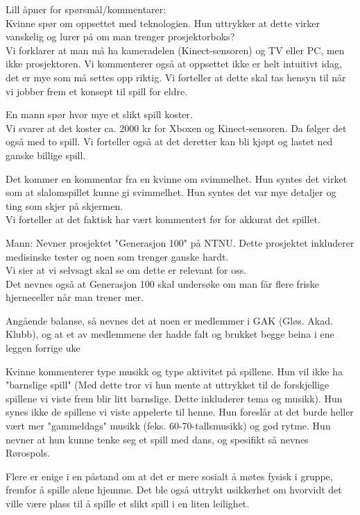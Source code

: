Lill åpner for spørsmål/kommentarer: \\
Kvinne spør om oppsettet med teknologien. Hun uttrykker at dette virker vanskelig og lurer på om man trenger prosjektorboks?\\
Vi forklarer at man må ha kameradelen (Kinect-sensoren) og TV eller PC, men ikke prosjektoren.
Vi kommenterer også at oppsettet ikke er helt intuitivt idag, det er mye som må settes opp riktig. Vi forteller at dette skal tas hensyn til når vi jobber frem et konsept til spill for eldre.

En mann spør hvor mye et slikt spill koster. \\
Vi svarer at det koster ca. 2000 kr for Xboxen og Kinect-sensoren. Da følger det også med to spill. Vi forteller også at det deretter kan bli kjøpt og lastet ned ganske billige spill.

Det kommer en kommentar fra en kvinne om svimmelhet. Hun syntes det virket som at slalomspillet kunne gi svimmelhet. Hun syntes det var mye detaljer og ting som skjer på skjermen. \\
Vi forteller at det faktisk har vært kommentert før for akkurat det spillet.

Mann: Nevner prosjektet "Generasjon 100" på NTNU. Dette prosjektet inkluderer medisinske tester og noen som trenger ganske hardt. \\
Vi sier at vi selvsagt skal se om dette er relevant for oss. \\ 
Det nevnes også at Generasjon 100 skal undersøke om man får flere friske hjerneceller når man trener mer.

Angående balanse, så nevnes det at noen er medlemmer i GAK 
(Gløs. Akad. Klubb), og at et av medlemmene der hadde falt og brukket
begge beina i ene leggen forrige uke

Kvinne kommenterer type musikk og type aktivitet på spillene.
Hun vil ikke ha "barnslige spill" (Med dette tror vi hun mente at uttrykket til de forskjellige spillene vi viste frem blir litt barnslige. Dette inkluderer tema og musikk). Hun synes ikke de spillene vi viste appelerte til henne. Hun foreslår at det burde heller vært mer "gammeldags" musikk (feks. 60-70-tallsmusikk) og god rytme. Hun nevner at hun kunne tenke seg et spill med dans, og spesifikt så nevnes Rørospols.

Flere er enige i en påstand om at det er mere sosialt å møtes fysisk 
i gruppe, fremfor å spille alene hjemme. Det ble også uttrykt usikkerhet om hvorvidt det ville være plass til å spille et slikt spill i en liten leilighet. 

